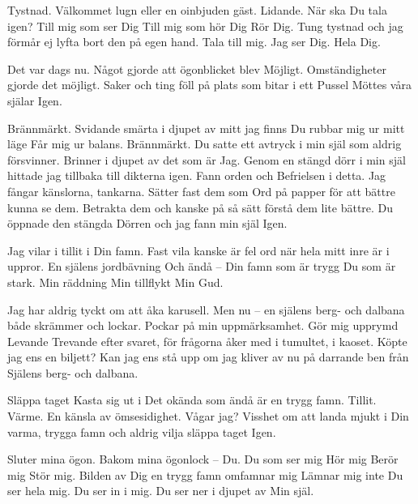 \startpoem
Tystnad.
Välkommet lugn
eller en oinbjuden gäst.
Lidande.
När ska Du tala igen?
Till mig som ser Dig
Till mig som hör Dig
Rör Dig.
Tung tystnad
och jag förmår ej lyfta bort den
på egen hand.
Tala till mig.
Jag ser Dig. 
Hela Dig.
\stoppoem

\startpoem
Det var dags nu.
Något gjorde att ögonblicket blev
Möjligt.
Omständigheter gjorde det möjligt.
Saker och ting
föll på plats 
som bitar i ett 
Pussel
Möttes våra själar 
Igen.


Brännmärkt.
Svidande smärta i djupet av 
mitt jag
finns Du
rubbar mig ur mitt läge
Får mig ur balans.
Brännmärkt.
Du satte ett avtryck
i min själ som aldrig försvinner.
Brinner i djupet
av det som är 
Jag.
Genom en stängd dörr i min själ
hittade jag tillbaka till dikterna igen.
Fann orden och 
Befrielsen i detta.
Jag fångar känslorna, tankarna.
Sätter fast dem som 
Ord på papper
för att bättre kunna se dem.
Betrakta dem 
och kanske på så sätt förstå dem 
lite bättre.
Du öppnade den stängda Dörren
och jag fann min själ
Igen.
\stoppoem

\startpoem
Jag vilar i tillit i Din famn.
Fast vila kanske är fel ord
när  hela mitt inre är i uppror.
En själens jordbävning 
Och ändå – Din famn
som är trygg
Du som är stark.
Min räddning
Min tillflykt
Min Gud.
\stoppoem

\startpoem
Jag har aldrig tyckt om att åka karusell. 
Men nu – en själens berg- och dalbana
både skrämmer och lockar.
Pockar på min uppmärksamhet.
Gör mig upprymd
Levande
Trevande
efter svaret, för frågorna åker med
i tumultet, i kaoset.
Köpte jag ens en biljett?
Kan jag ens stå upp om jag kliver av nu
på darrande ben från
Själens berg- och dalbana.
\stoppoem

\startpoem
Släppa taget
Kasta sig ut i 
Det okända
som ändå är en trygg famn.
Tillit.
Värme.
En känsla av ömsesidighet.
Vågar jag?
Visshet om att landa mjukt
i Din varma, trygga famn
och aldrig vilja släppa taget
Igen. 
\stoppoem

\startpoem
Sluter mina ögon.
Bakom mina ögonlock – Du.
Du som ser mig
Hör mig
Berör mig
Stör mig.
Bilden av Dig
en trygg famn omfamnar mig
Lämnar mig inte
Du ser hela mig. 
Du ser in i mig.
Du ser ner i djupet av
Min själ.
\stoppoem


